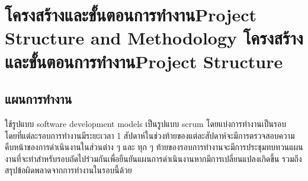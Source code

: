 \chapter{\ifproject%
\ifcpe โครงสร้างและขั้นตอนการทำงาน\else Project Structure and Methodology\fi
\else%
\ifcpe โครงสร้างและขั้นตอนการทำงาน\else Project Structure\fi
\fi
}


\makeatletter


\makeatother

\section{แผนการทำงาน}
\quad ใช้รูปแบบ software development models เป็นรูปแบบ scrum โดยแบ่งการทำงานเป็นรอบ 
โดยที่แต่ละรอบการทำงานมีระยะเวลา 1 สัปดาห์ในช่วงท้ายของแต่ละสัปดาห์จะมีการตรวจสอบความคืบหน้าของการดำเนินงานในส่วนต่าง ๆ 
และ ทุก ๆ ท้ายของรอบการทำงานจะมีการประชุมทบทวนแผนงานที่จะทำสำหรับรอบถัดไปร่วมกันเพื่อยืนยันแผนการดำเนินงานหากมีการเปลี่ยนแปลงเกิดขึ้น 
รวมถึงสรุปข้อผิดพลาดจากการทำงานในรอบนี้ด้วย
